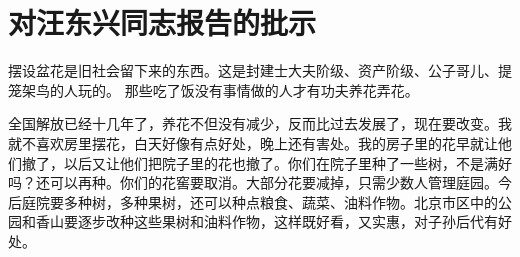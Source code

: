 \section[对汪东兴同志报告的批示（一九六四年七月）]{对汪东兴同志报告的批示}


摆设盆花是旧社会留下来的东西。这是封建士大夫阶级、资产阶级、公子哥儿、提笼架鸟的人玩的。 那些吃了饭没有事情做的人才有功夫养花弄花。

全国解放已经十几年了，养花不但没有减少，反而比过去发展了，现在要改变。我就不喜欢房里摆花，白天好像有点好处，晚上还有害处。我的房子里的花早就让他们撤了，以后又让他们把院子里的花也撤了。你们在院子里种了一些树，不是满好吗？还可以再种。你们的花窖要取消。大部分花要减掉，只需少数人管理庭园。今后庭院要多种树，多种果树，还可以种点粮食、蔬菜、油料作物。北京市区中的公园和香山要逐步改种这些果树和油料作物，这样既好看，又实惠，对子孙后代有好处。

